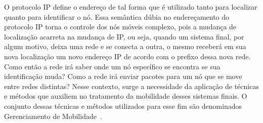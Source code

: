 \documentclass[	12pt, Times, openright, twoside, a4paper, english, brazil]{abntex2}
\begin{document}
O protocolo IP define o endereço de tal forma que é utilizado tanto para localizar quanto para identificar o nó. Essa semântica dúbia no endereçamento do protocolo IP torna o controle dos nós móveis complexo, pois a mudança de localização acarreta na mudança de IP, ou seja, quando um sistema final, por algum motivo, deixa uma rede e se conecta a outra, o mesmo receberá em sua nova localização um novo endereço IP de acordo com o prefixo dessa nova rede. Como então a rede irá saber onde um nó específico se encontra se sua identificação muda? Como a rede irá enviar pacotes para um nó que se move entre redes distintas? Nesse contexto, surge a necessidade da aplicação de técnicas e métodos que auxiliem no tratamento da mobilidade desses sistemas finais. O conjunto dessas técnicas e métodos utilizados para esse fim são denominados Gerenciamento de Mobilidade~\cite{pandya2004}.

\end{document}
